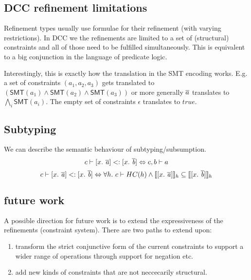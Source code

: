 \documentclass[a4paper]{article}
\begin{document}
\subsection{DCC refinement limitations}
%
Refinement types usually use formulae for their refinement (with varying restrictions).
In DCC we the refinements are limited to a set of (structural) constraints
and all of those need to be fulfilled simultaneously.
This is equivalent to a big conjunction in the language of predicate logic.

Interestingly, this is exactly how the translation in the SMT encoding works.
E.g. a set of constraints $(a_1, a_2, a_3)$ gets translated to
$(\mathsf{SMT}(a_1) \land \mathsf{SMT}(a_2) \land \mathsf{SMT}(a_3))$
or more generally $\overline{a}$ translates to $\bigwedge_i \mathsf{SMT}(a_i)$.
The empty set of constraints $\epsilon$ translates to $true$.

\subsection{Subtyping}
We can describe the semantic behaviour of subtyping/subsumption.
\[
  c \vdash [x.\ \mathit{\overline{a}}] <: [x.\ \mathit{\overline{b}}]
  \Leftrightarrow
  c,b \vdash a
\]
\[
  c \vdash [x.\ \mathit{\overline{a}}] <: [x.\ \mathit{\overline{b}}]
  \Leftrightarrow
  \forall h.~c \vdash HC(h) \land \llbracket[x.\ \mathit{\overline{a}}]\rrbracket_{h} \subseteq \llbracket[x.\ \mathit{\overline{b}}]\rrbracket_{h}
\]


\subsection{future work}
%
A possible direction for future work is to extend the expressiveness
of the refinements (constraint system). There are two paths to extend upon:
\begin{enumerate}
  \item transform the strict conjunctive form of the current constraints to
        support a wider range of operations through support for negation etc.
  \item add new kinds of constraints that are not neccecarily structural.
\end{enumerate}

\end{document}
